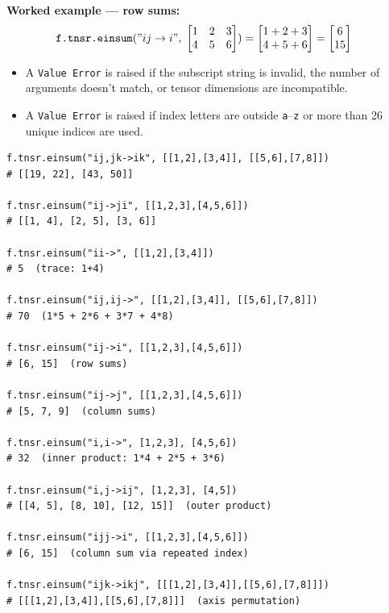 \textbf{Worked example — row sums:}
\begin{align*}
\texttt{f.tnsr.einsum}("ij \rightarrow i",\; \begin{bmatrix} 1 & 2 & 3 \\ 4 & 5 & 6 \end{bmatrix}) &= \begin{bmatrix} 1+2+3 \\ 4+5+6 \end{bmatrix} = \begin{bmatrix} 6 \\ 15 \end{bmatrix}
\end{align*}

\begin{itemize}
\item A \texttt{Value Error} is raised if the subscript string is invalid, the number of arguments doesn't match, or tensor dimensions are incompatible.
\item A \texttt{Value Error} is raised if index letters are outside \texttt{a}--\texttt{z} or more than 26 unique indices are used.
\end{itemize}
\begin{verbatim}
f.tnsr.einsum("ij,jk->ik", [[1,2],[3,4]], [[5,6],[7,8]])
# [[19, 22], [43, 50]]

f.tnsr.einsum("ij->ji", [[1,2,3],[4,5,6]])
# [[1, 4], [2, 5], [3, 6]]

f.tnsr.einsum("ii->", [[1,2],[3,4]])
# 5  (trace: 1+4)

f.tnsr.einsum("ij,ij->", [[1,2],[3,4]], [[5,6],[7,8]])
# 70  (1*5 + 2*6 + 3*7 + 4*8)

f.tnsr.einsum("ij->i", [[1,2,3],[4,5,6]])
# [6, 15]  (row sums)

f.tnsr.einsum("ij->j", [[1,2,3],[4,5,6]])
# [5, 7, 9]  (column sums)

f.tnsr.einsum("i,i->", [1,2,3], [4,5,6])
# 32  (inner product: 1*4 + 2*5 + 3*6)

f.tnsr.einsum("i,j->ij", [1,2,3], [4,5])
# [[4, 5], [8, 10], [12, 15]]  (outer product)

f.tnsr.einsum("ijj->i", [[1,2,3],[4,5,6]])
# [6, 15]  (column sum via repeated index)

f.tnsr.einsum("ijk->ikj", [[[1,2],[3,4]],[[5,6],[7,8]]])
# [[[1,2],[3,4]],[[5,6],[7,8]]]  (axis permutation)
\end{verbatim}


